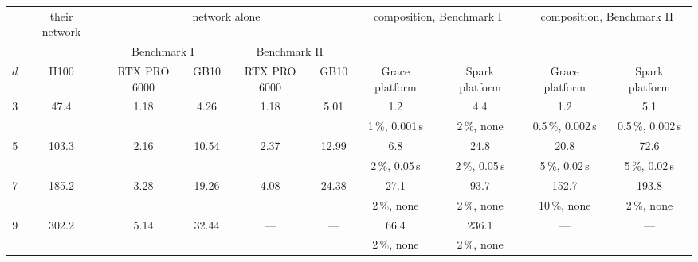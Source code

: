 \begin{tabular}{@{}cccccccccc@{}}
\toprule
& their network & \multicolumn{4}{c}{network alone} & \multicolumn{2}{c}{composition, Benchmark I} & \multicolumn{2}{c}{composition, Benchmark II} \\
\cmidrule(lr){3-6}\cmidrule(lr){7-8}\cmidrule(lr){9-10}
& & \multicolumn{2}{c}{Benchmark I} & \multicolumn{2}{c}{Benchmark II} & & & & \\
$d$ & H100 & RTX PRO 6000 & GB10 & RTX PRO 6000 & GB10 & Grace platform & Spark platform & Grace platform & Spark platform \\
\midrule
3 & 47.4 & 1.18 & 4.26 & 1.18 & 5.01 & 1.2 & 4.4 & 1.2 & 5.1 \\
 &  &  &  &  &  & {\tiny 1\,\%, 0.001\,s} & {\tiny 2\,\%, none} & {\tiny 0.5\,\%, 0.002\,s} & {\tiny 0.5\,\%, 0.002\,s} \\
5 & 103.3 & 2.16 & 10.54 & 2.37 & 12.99 & 6.8 & 24.8 & 20.8 & 72.6 \\
 &  &  &  &  &  & {\tiny 2\,\%, 0.05\,s} & {\tiny 2\,\%, 0.05\,s} & {\tiny 5\,\%, 0.02\,s} & {\tiny 5\,\%, 0.02\,s} \\
7 & 185.2 & 3.28 & 19.26 & 4.08 & 24.38 & 27.1 & 93.7 & 152.7 & 193.8 \\
 &  &  &  &  &  & {\tiny 2\,\%, none} & {\tiny 2\,\%, none} & {\tiny 10\,\%, none} & {\tiny 2\,\%, none} \\
9 & 302.2 & 5.14 & 32.44 & --- & --- & 66.4 & 236.1 & --- & --- \\
 &  &  &  &  &  & {\tiny 2\,\%, none} & {\tiny 2\,\%, none} &  &  \\
\bottomrule
\end{tabular}
